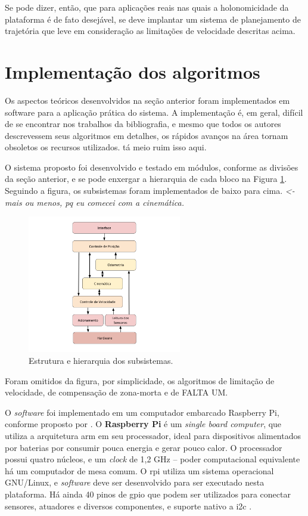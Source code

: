 Se pode dizer, então, que para aplicações reais nas quais a holonomicidade da plataforma é de fato desejável, se deve implantar um sistema de planejamento de trajetória que leve em consideração as limitações de velocidade descritas acima.

\section{Implementação dos algoritmos}
\label{sec:software}

Os aspectos teóricos desenvolvidos na seção anterior foram implementados em software para a aplicação prática do sistema. A implementação é, em geral, difícil de se encontrar nos trabalhos da bibliografia, e mesmo que todos os autores descrevessem seus algoritmos em detalhes, os rápidos avanços na área tornam obsoletos os recursos utilizados. tá meio ruim isso aqui.


O sistema proposto foi desenvolvido e testado em módulos, conforme as divisões da seção anterior, e se pode enxergar a hierarquia de cada bloco na Figura \ref{fig:sistema}. Seguindo a figura, os subsistemas foram implementados de baixo para cima. \textit{<- mais ou menos, pq eu comecei com a cinemática.}

\begin{figure}[h]
  \centering
  \includegraphics[width = 0.6\textwidth]{imagens/sistema}
  \caption{Estrutura e hierarquia dos subsistemas.}
  \label{fig:sistema}
\end{figure}

Foram omitidos da figura, por simplicidade, os algoritmos de limitação de velocidade, de compensação de zona-morta e de FALTA UM.

O \textit{software} foi implementado em um computador embarcado Raspberry Pi, conforme proposto por \citet{ritter2016modelagem}. O \textbf{Raspberry Pi} é um \emph{single board computer}, que utiliza a arquitetura \acrshort{arm} em seu processador, ideal para dispositivos alimentados por baterias por consumir pouca energia e gerar pouco calor. O processador possui quatro núcleos, e um \emph{clock} de 1,2 GHz -- poder computacional equivalente há um computador de mesa comum. O \acrshort{rpi} utiliza um sistema operacional GNU/Linux, e \emph{software} deve ser desenvolvido para ser executado nesta plataforma. Há ainda 40 pinos de \acrshort{gpio} que podem ser utilizados para conectar sensores, atuadores e diversos componentes, e suporte nativo a \acrshort{i2c} \citep{upton2014raspberry}.

